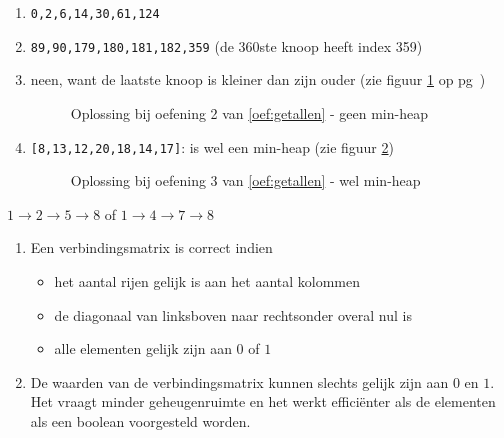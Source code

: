 \begin{Oplossing}{6.7}
\begin{enumerate}
\item \verb/0,2,6,14,30,61,124/
\item \verb/89,90,179,180,181,182,359/ (de 360ste knoop heeft index 359)
\item neen, want de laatste knoop is kleiner dan zijn ouder  (zie figuur \ref{fig:geenMinHeap} op pg~\pageref{fig:geenMinHeap})
\begin{figure}[htbp]
    \centering
{}
\caption{Oplossing bij oefening 2 van \ref{oef:getallen} - geen min-heap}
\label{fig:geenMinHeap}
\end{figure}
\item \verb/[8,13,12,20,18,14,17]/: is wel een min-heap (zie figuur \ref{fig:welMinHeap})
\begin{figure}[htbp]
    \centering
{}
\caption{Oplossing bij oefening 3 van \ref{oef:getallen} - wel min-heap}
\label{fig:welMinHeap}
\end{figure}
\end{enumerate}
\end{Oplossing}
\begin{Oplossing}{7.1}
$1\rightarrow2\rightarrow5\rightarrow8$ of $1\rightarrow4\rightarrow7\rightarrow8$
\end{Oplossing}
\begin{Oplossing}{7.3}
\begin{enumerate}
\item Een verbindingsmatrix is correct indien
\begin{itemize}
\item het aantal rijen gelijk is aan het aantal kolommen
\item de diagonaal van linksboven naar rechtsonder overal nul is
\item alle elementen gelijk zijn aan $0$ of $1$
\end{itemize}
\item De waarden van de verbindingsmatrix kunnen slechts gelijk zijn aan $0$ en $1$. Het vraagt minder geheugenruimte en het werkt efficiënter als de elementen als een boolean voorgesteld worden.
\end{enumerate}
\end{Oplossing}
